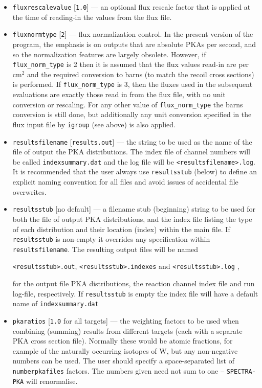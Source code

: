 \documentclass[a4paper]{article}
\begin{document}
\begin{itemize}
\item \texttt{flux{\textunderscore}rescale{\textunderscore}value} [\texttt{1.0}] --- an optional flux rescale factor that is applied at the time of reading-in the values from the flux file.

\item \texttt{flux{\textunderscore}norm{\textunderscore}type} [\texttt{2}] --- flux normalization control. In the present version of the program, the emphasis is on outputs that are absolute PKAs per second, and so the normalization features are largely obsolete. However, if \verb|flux_norm_type| is 2 then it is assumed that the flux values read-in are per cm\(^2\) and the required conversion to barns (to match the recoil cross sections) is performed. If \verb|flux_norm_type| is 3, then the fluxes used in the subsequent evaluations are exactly those read in from the flux file, with no unit conversion or rescaling. For any other value of \verb|flux_norm_type| the barns conversion is still done, but additionally any unit conversion specified in the flux input file by \texttt{igroup} (see above) is also applied.
\item \texttt{results{\textunderscore}filename} [\texttt{results.out}] --- the string to be used as the name of the file of output the PKA distributions. The index file of channel numbers will be called \texttt{index{\textunderscore}summary.dat} and the log file will be \texttt{<results{\textunderscore}filename>.log}. It is recommended that the user always use \texttt{results{\textunderscore}stub} (below) to define an explicit naming convention for all files and avoid issues of accidental file overwrites.
\item \texttt{results{\textunderscore}stub} [no default] --- a filename stub (beginning) string to be used for both the file of output PKA distributions, and the index file listing the type of each distribution and their location (index) within the main file. If \texttt{results{\textunderscore}stub} is non-empty it overrides any specification within \texttt{results{\textunderscore}filename}. The resulting output files will be named{\begin{center}\texttt{<results{\textunderscore}stub>.out}, \texttt{<results{\textunderscore}stub>.indexes} and \texttt{<results{\textunderscore}stub>.log} ,\end{center}}for the output file PKA distributions, the reaction channel index file and run log-file, respectively. If \texttt{results{\textunderscore}stub} is empty the index file will have a default name of \texttt{index{\textunderscore}summary.dat}
\item \texttt{pka{\textunderscore}ratios} [\texttt{1.0} for all targets] --- the weighting factors to be used when combining (summing) results from different targets (each with a separate PKA cross section file). Normally these would be atomic fractions, for example of the naturally occurring isotopes of W, but any non-negative numbers can be used. The user should specify a space-separated list of \texttt{number{\textunderscore}pka{\textunderscore}files} factors. The numbers given need not sum to one -- \texttt{SPECTRA-PKA} will renormalise.



\end{itemize}
\end{document}
